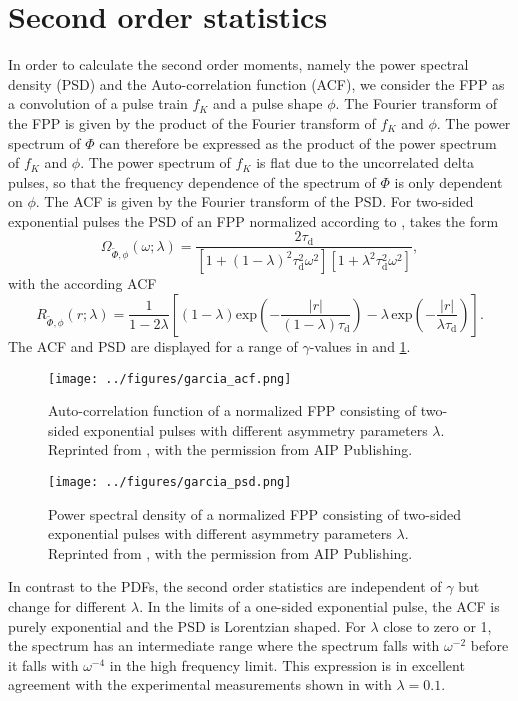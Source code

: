 \section{Second order statistics}

In order to calculate the second order moments, namely the power spectral density (PSD) and the Auto-correlation function (ACF), we consider the FPP as a convolution of a pulse train $f_K$ and a pulse shape $\phi$. The Fourier transform of the FPP is given by the product of the Fourier transform of $f_K$ and $\phi$. The power spectrum of $\Phi$ can therefore be expressed as the product of the power spectrum of $f_K$ and $\phi$. The power spectrum of $f_K$ is flat due to the uncorrelated delta pulses, so that the frequency dependence of the spectrum of $\Phi$ is only dependent on $\phi$. The ACF is given by the Fourier transform of the PSD. For two-sided exponential pulses the PSD of an FPP normalized according to , takes the form \cite{garcia2017auto}
\begin{equation}
	\Omega_{\widetilde{\Phi},\phi}(\omega;\lambda) = \frac{2 \tau_\mathrm{d}}{[1+(1-\lambda)^2\tau_\mathrm{d}^2\omega^2][1+\lambda^2\tau_\mathrm{d}^2\omega^2]},
\end{equation}
with the according ACF
\begin{equation}
	R_{\widetilde{\Phi},\phi}(r;\lambda) = \frac{1}{1-2\lambda}\left[\left(1-\lambda\right)\mathrm{exp}\left(-\frac{|r|}{(1-\lambda)\tau_\mathrm{d}}\right) -\lambda\,\mathrm{exp}\left(-\frac{|r|}{\lambda\tau_\mathrm{d}}\right)\right].
\end{equation}
The ACF and PSD are displayed for a range of $\gamma$-values in  and \ref{Fig:garcia_psd}.
\begin{figure}
	\centering
	\begin{minipage}{.48\linewidth}
		\texttt{[image: ../figures/garcia\_acf.png]}
		\caption{Auto-correlation function of a normalized FPP consisting of two-sided exponential pulses with different asymmetry parameters $\lambda$. Reprinted from \cite{garcia2017auto}, with the permission from AIP Publishing.}
		\label{Fig:garcia_acf}
	\end{minipage}
	\hfill
	\begin{minipage}{.48\linewidth}
		\texttt{[image: ../figures/garcia\_psd.png]}
		\caption{Power spectral density of a normalized FPP consisting of two-sided exponential pulses with different asymmetry parameters $\lambda$. Reprinted from \cite{garcia2017auto}, with the permission from AIP Publishing.}
		\label{Fig:garcia_psd}
	\end{minipage}
\end{figure}
In contrast to the PDFs, the second order statistics are independent of $\gamma$ but change for different $\lambda$. In the limits of a one-sided exponential pulse, the ACF is purely exponential and the PSD is Lorentzian shaped. For $\lambda$ close to zero or 1, the spectrum has an intermediate range where the spectrum falls with $\omega^{-2}$ before it falls with $\omega^{-4}$ in the high frequency limit. This expression is in excellent agreement with the experimental measurements shown in  with $\lambda=0.1$. 

